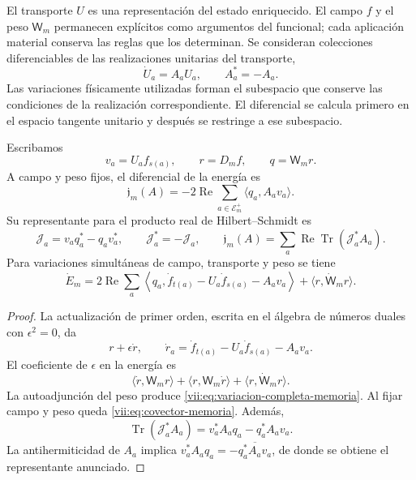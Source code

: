 El transporte \(U\) es una representación del estado enriquecido. El campo
\(f\) y el peso \(\mathsf W_m\) permanecen explícitos como argumentos
del funcional; cada aplicación material conserva las reglas que los
determinan. Se consideran colecciones diferenciables de las realizaciones
unitarias del transporte,
\[
 \dot U_a=A_aU_a,\qquad A_a^*=-A_a.
\]
Las variaciones físicamente utilizadas forman el subespacio que conserve
las condiciones de la realización correspondiente. El diferencial se
calcula primero en el espacio tangente unitario y después se restringe
a ese subespacio.

\begin{proposition}
\label{vii:prop:covector-memoria}
Escribamos
\[
 v_a=U_af_{s(a)},\qquad r=D_mf,\qquad q=\mathsf W_mr.
\]
A campo y peso fijos, el diferencial de la energía es
\begin{equation}
 \mathfrak j_m(A)=-2\operatorname{Re}
       \sum_{a\in\mathcal E_m^+}\langle q_a,A_av_a\rangle .
 \label{vii:eq:covector-memoria}
\end{equation}
Su representante para el producto real de Hilbert--Schmidt es
\begin{equation}
 \mathcal J_a=v_aq_a^*-q_av_a^*,\qquad
 \mathcal J_a^*=-\mathcal J_a,\qquad
 \mathfrak j_m(A)=
 \sum_a\operatorname{Re}\operatorname{Tr}(\mathcal J_a^*A_a).
 \label{vii:eq:representante-corriente-discreta}
\end{equation}
Para variaciones simultáneas de campo, transporte y peso se tiene
\begin{equation}
 \dot E_m=
 2\operatorname{Re}\sum_a
 \left\langle q_a,\dot f_{t(a)}-U_a\dot f_{s(a)}-A_av_a\right\rangle
 +\langle r,\dot{\mathsf W}_mr\rangle .
 \label{vii:eq:variacion-completa-memoria}
\end{equation}
\end{proposition}

\begin{proof}
La actualización de primer orden, escrita en el álgebra de números
duales con \(\epsilon^2=0\), da
\[
 r+\epsilon\dot r,\qquad
 \dot r_a=\dot f_{t(a)}-U_a\dot f_{s(a)}-A_av_a.
\]
El coeficiente de \(\epsilon\) en la energía es
\[
 \langle\dot r,\mathsf W_mr\rangle+
 \langle r,\mathsf W_m\dot r\rangle+
 \langle r,\dot{\mathsf W}_mr\rangle.
\]
La autoadjunción del peso produce
\eqref{vii:eq:variacion-completa-memoria}. Al fijar campo y peso queda
\eqref{vii:eq:covector-memoria}. Además,
\[
 \operatorname{Tr}(\mathcal J_a^*A_a)
 =v_a^*A_aq_a-q_a^*A_av_a.
\]
La antihermiticidad de \(A_a\) implica
\(v_a^*A_aq_a=-\overline{q_a^*A_av_a}\), de donde se obtiene
el representante anunciado.
\end{proof}

